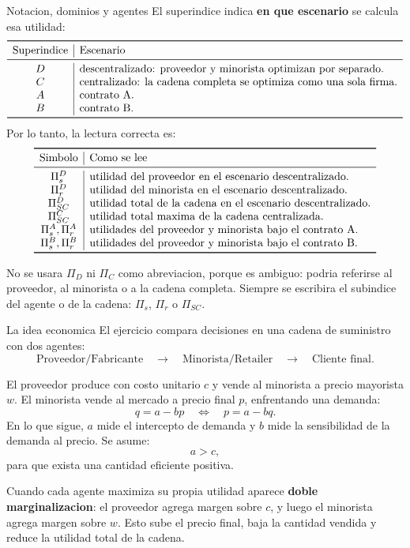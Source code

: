 \begin{materia}{Notacion, dominios y agentes}
El superindice indica \textbf{en que escenario} se calcula esa utilidad:
\[
\begin{array}{c|l}
\toprule
\text{Superindice} & \text{Escenario} \\
\midrule
D & \text{descentralizado: proveedor y minorista optimizan por separado.}\\
C & \text{centralizado: la cadena completa se optimiza como una sola firma.}\\
A & \text{contrato A.}\\
B & \text{contrato B.}\\
\bottomrule
\end{array}
\]
Por lo tanto, la lectura correcta es:
\[
\begin{array}{c|l}
\toprule
\text{Simbolo} & \text{Como se lee} \\
\midrule
\Pi_s^D & \text{utilidad del proveedor en el escenario descentralizado.}\\
\Pi_r^D & \text{utilidad del minorista en el escenario descentralizado.}\\
\Pi_{SC}^D & \text{utilidad total de la cadena en el escenario descentralizado.}\\
\Pi_{SC}^C & \text{utilidad total maxima de la cadena centralizada.}\\
\Pi_s^A,\Pi_r^A & \text{utilidades del proveedor y minorista bajo el contrato A.}\\
\Pi_s^B,\Pi_r^B & \text{utilidades del proveedor y minorista bajo el contrato B.}\\
\bottomrule
\end{array}
\]

No se usara \(\Pi_D\) ni \(\Pi_C\) como abreviacion, porque es ambiguo: podria referirse al proveedor, al minorista o a la cadena completa. Siempre se escribira el subindice del agente o de la cadena: \(\Pi_s\), \(\Pi_r\) o \(\Pi_{SC}\).
\end{materia}

\begin{materia}{La idea economica}
El ejercicio compara decisiones en una cadena de suministro con dos agentes:
\[
\text{Proveedor/Fabricante}
\quad\longrightarrow\quad
\text{Minorista/Retailer}
\quad\longrightarrow\quad
\text{Cliente final}.
\]

El proveedor produce con costo unitario \(c\) y vende al minorista a precio mayorista \(w\). El minorista vende al mercado a precio final \(p\), enfrentando una demanda:
\[
q=a-bp
\quad\Longleftrightarrow\quad
p=a-bq.
\]
En lo que sigue, \(a\) mide el intercepto de demanda y \(b\) mide la sensibilidad de la demanda al precio. Se asume:
\[
a>c,
\]
para que exista una cantidad eficiente positiva.

Cuando cada agente maximiza su propia utilidad aparece \textbf{doble marginalizacion}: el proveedor agrega margen sobre \(c\), y luego el minorista agrega margen sobre \(w\). Esto sube el precio final, baja la cantidad vendida y reduce la utilidad total de la cadena.
\end{materia}

